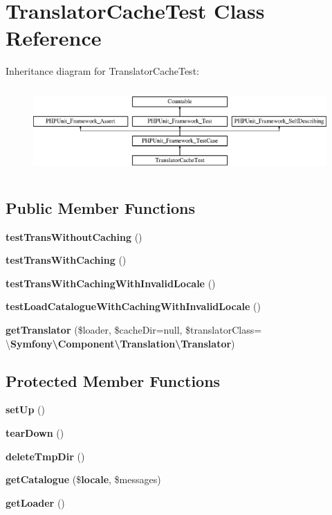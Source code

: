 \section{Translator\+Cache\+Test Class Reference}
\label{class_symfony_1_1_component_1_1_translation_1_1_tests_1_1_translator_cache_test}
Inheritance diagram for Translator\+Cache\+Test\+:\begin{figure}[H]
\begin{center}
\leavevmode
\includegraphics[height=3.303835cm]{class_symfony_1_1_component_1_1_translation_1_1_tests_1_1_translator_cache_test}
\end{center}
\end{figure}
\subsection*{Public Member Functions}
\begin{DoxyCompactItemize}
\item 
{\bf test\+Trans\+Without\+Caching} ()
\item 
{\bf test\+Trans\+With\+Caching} ()
\item 
{\bf test\+Trans\+With\+Caching\+With\+Invalid\+Locale} ()
\item 
{\bf test\+Load\+Catalogue\+With\+Caching\+With\+Invalid\+Locale} ()
\item 
{\bf get\+Translator} (\$loader, \$cache\+Dir=null, \$translator\+Class= \textquotesingle{}\textbackslash{}{\bf Symfony\textbackslash{}\+Component\textbackslash{}\+Translation\textbackslash{}\+Translator}\textquotesingle{})
\end{DoxyCompactItemize}
\subsection*{Protected Member Functions}
\begin{DoxyCompactItemize}
\item 
{\bf set\+Up} ()
\item 
{\bf tear\+Down} ()
\item 
{\bf delete\+Tmp\+Dir} ()
\item 
{\bf get\+Catalogue} (\${\bf locale}, \$messages)
\item 
{\bf get\+Loader} ()
\end{DoxyCompactItemize}
